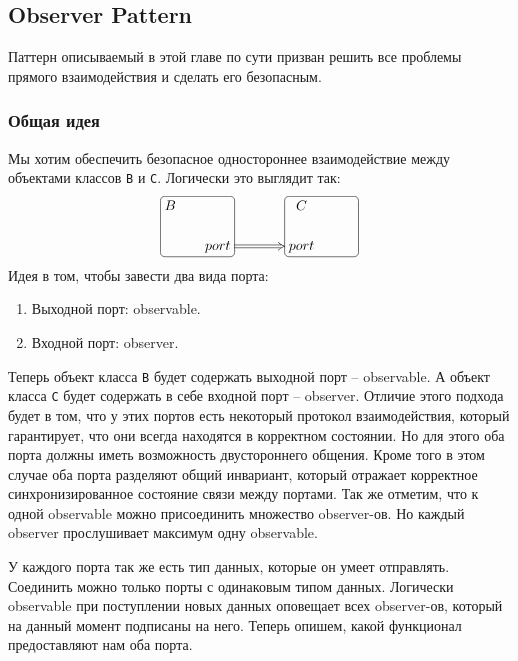 \subsection{Observer Pattern}
\label{section::Observer}

Паттерн описываемый в этой главе по сути призван решить все проблемы прямого взаимодействия и сделать его безопасным.

\subsubsection{Общая идея}

Мы хотим обеспечить безопасное одностороннее взаимодействие между объектами классов \verb"B" и \verb"C".
Логически это выглядит так:
\[
\xymatrix@R=15pt@C=15pt{
	{B}
	{
	\save
   [].[rd]*[F-:<3pt>]\frm{}
   \restore
	}
	&{}&{}&{C}
	&{\phantom{C}}\\
	{}&{port}\ar@{=>}[rr]%
	&{}&{port}
	{
	\save
   [].[ru]*[F-:<3pt>]\frm{}
   \restore
	}	
	&{}\\
}
\]
Идея в том, чтобы завести два вида порта:
\begin{enumerate}
\item Выходной порт: observable.

\item Входной порт: observer.
\end{enumerate}
Теперь объект класса \verb"B" будет содержать выходной порт -- observable.
А объект класса \verb"C" будет содержать в себе входной порт -- observer.
Отличие этого подхода будет в том, что у этих портов есть некоторый протокол взаимодействия, который гарантирует, что они всегда находятся в корректном состоянии.
Но для этого оба порта должны иметь возможность двустороннего общения.
Кроме того в этом случае оба порта разделяют общий инвариант, который отражает корректное синхронизированное состояние связи между портами.
Так же отметим, что к одной observable можно присоединить множество observer-ов.
Но каждый observer прослушивает максимум одну observable.

У каждого порта так же есть тип данных, которые он умеет отправлять.
Соединить можно только порты с одинаковым типом данных.
Логически observable при поступлении новых данных оповещает всех observer-ов, который на данный момент подписаны на него.
Теперь опишем, какой функционал предоставляют нам оба порта.

